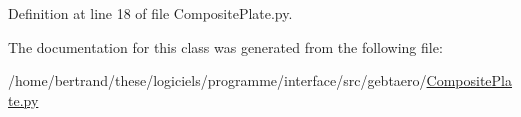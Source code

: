 Definition at line 18 of file Composite\+Plate.\+py.



The documentation for this class was generated from the following file\+:\begin{DoxyCompactItemize}
\item 
/home/bertrand/these/logiciels/programme/interface/src/gebtaero/\hyperlink{_composite_plate_8py}{Composite\+Plate.\+py}\end{DoxyCompactItemize}
